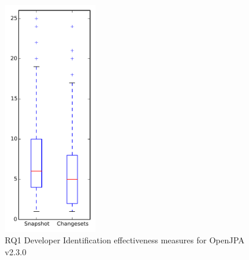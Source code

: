
\begin{figure}[t]
\centering
\includegraphics[width=0.36\textwidth]{figures/dit/rq1_openjpa}
\caption{RQ1 Developer Identification effectiveness measures for OpenJPA v2.3.0}
\label{fig:dit:rq1:openjpa}
\end{figure}
